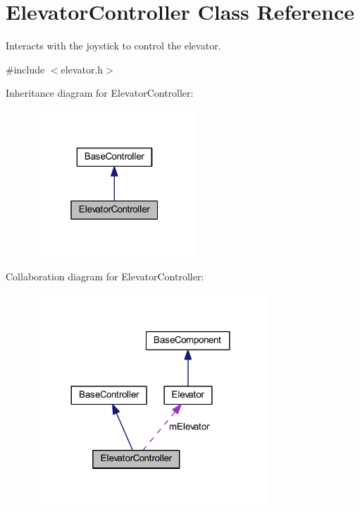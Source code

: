 \hypertarget{class_elevator_controller}{\section{\-Elevator\-Controller \-Class \-Reference}
\label{class_elevator_controller}
}


\-Interacts with the joystick to control the elevator.  




{\ttfamily \#include $<$elevator.\-h$>$}



\-Inheritance diagram for \-Elevator\-Controller\-:\nopagebreak
\begin{figure}[H]
\begin{center}
\leavevmode
\includegraphics[width=172pt]{class_elevator_controller__inherit__graph}
\end{center}
\end{figure}


\-Collaboration diagram for \-Elevator\-Controller\-:\nopagebreak
\begin{figure}[H]
\begin{center}
\leavevmode
\includegraphics[width=248pt]{class_elevator_controller__coll__graph}
\end{center}
\end{figure}

